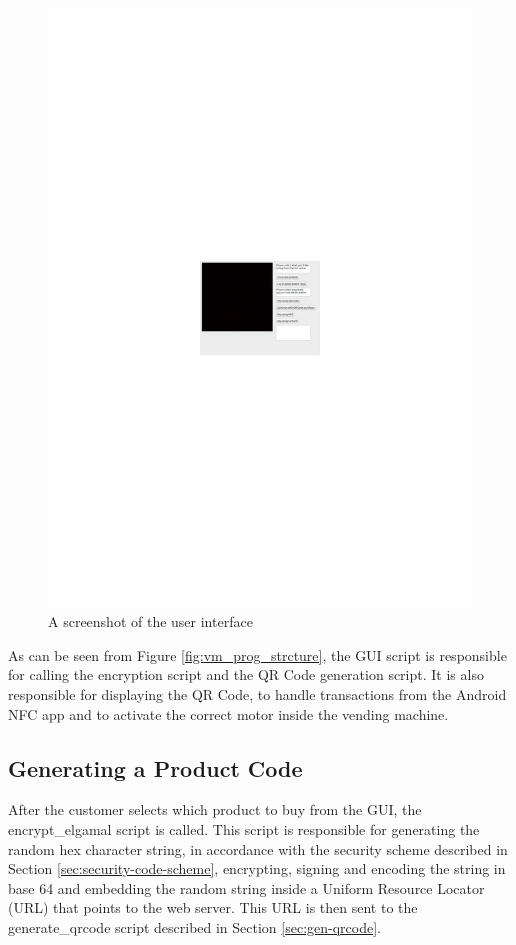 \begin{figure}
 \centering 
 \includegraphics[scale=0.4]{gui_screenshot}
 \caption{A screenshot of the user interface}
 \label{fig:gui-screenshot}
\end{figure}

As can be seen from Figure \ref{fig:vm_prog_strcture}, the GUI script is
responsible for calling the encryption script and the QR Code generation script.
It is also responsible for displaying the QR Code, to handle transactions from
the Android NFC app and to activate the correct motor inside the vending
machine. 

\subsection{Generating a Product Code}

After the customer selects which product to buy from the GUI, the
encrypt\_elgamal script is called. This script is responsible for generating the
random hex character string, in accordance with the security scheme described in
Section \ref{sec:security-code-scheme}, encrypting, signing and encoding the
string in base 64 and embedding the random string inside a Uniform
Resource Locator (URL) that points to the web server. This URL is then sent to
the generate\_qrcode script described in Section \ref{sec:gen-qrcode}.

